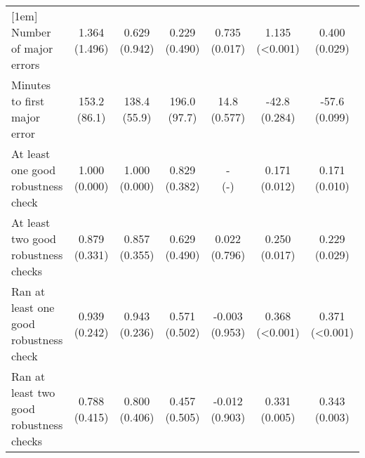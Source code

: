\begin{table}[ht]
{\begin{tabular}{lcccccc}
[1em]
Number of major errors & \shortstack{1.364\\(1.496)} & \shortstack{0.629\\(0.942)} & \shortstack{0.229\\(0.490)} & \shortstack{0.735\\(0.017)} & \shortstack{1.135\\(\textless0.001)} & \shortstack{0.400\\(0.029)}\\
[1em]
Minutes to first major error & \shortstack{153.2\\(86.1)} & \shortstack{138.4\\(55.9)} & \shortstack{196.0\\(97.7)} & \shortstack{14.8\\(0.577)} & \shortstack{-42.8\\(0.284)} & \shortstack{-57.6\\(0.099)}\\
[1em]
At least one good robustness check & \shortstack{1.000\\(0.000)} & \shortstack{1.000\\(0.000)} & \shortstack{0.829\\(0.382)} & \shortstack{-\\(-)} & \shortstack{0.171\\(0.012)} & \shortstack{0.171\\(0.010)}\\
[1em]
At least two good robustness checks & \shortstack{0.879\\(0.331)} & \shortstack{0.857\\(0.355)} & \shortstack{0.629\\(0.490)} & \shortstack{0.022\\(0.796)} & \shortstack{0.250\\(0.017)} & \shortstack{0.229\\(0.029)}\\
[1em]
Ran at least one good robustness check & \shortstack{0.939\\(0.242)} & \shortstack{0.943\\(0.236)} & \shortstack{0.571\\(0.502)} & \shortstack{-0.003\\(0.953)} & \shortstack{0.368\\(\textless0.001)} & \shortstack{0.371\\(\textless0.001)}\\
[1em]
Ran at least two good robustness checks & \shortstack{0.788\\(0.415)} & \shortstack{0.800\\(0.406)} & \shortstack{0.457\\(0.505)} & \shortstack{-0.012\\(0.903)} & \shortstack{0.331\\(0.005)} & \shortstack{0.343\\(0.003)}\\

\end{tabular}}
\end{table}
